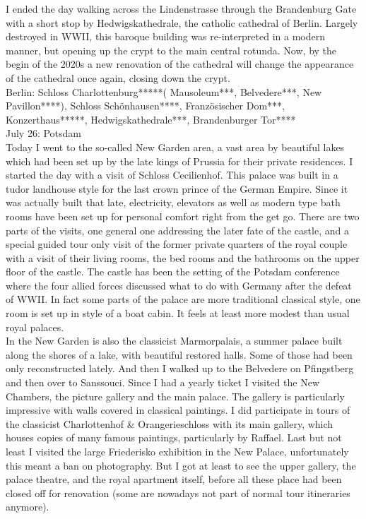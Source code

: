 I ended the day walking across the Lindenstrasse through the Brandenburg Gate with a short stop by Hedwigskathedrale, the catholic cathedral of Berlin. Largely destroyed in WWII, this baroque building was re-interpreted in a modern manner, but opening up the crypt to the main central rotunda. Now, by the begin of the 2020s a new renovation of the cathedral will change the appearance of the cathedral once again, closing down the crypt.\\

Berlin: Schloss Charlottenburg*****( Mausoleum***, Belvedere***, New Pavillon****), Schloss Sch\"onhausen****, Franz\"osischer Dom***, Konzerthaus*****, Hedwigskathedrale***, Brandenburger Tor****\\

July 26: Potsdam\\
Today I went to the so-called New Garden area, a vast area by beautiful lakes which had been set up by the late kings of Prussia for their private residences. I started the day with a visit of Schloss Cecilienhof. This palace was built in a tudor landhouse style for the last crown prince of the German Empire. Since it was actually built that late, electricity, elevators as well as modern type bath rooms have been set up for personal comfort right from the get go. There are two parts of the visits, one general one addressing the later fate of the castle, and a special guided tour only visit of the former private quarters of the royal couple with a visit of their living rooms, the bed rooms and the bathrooms on the upper floor of the castle. The castle has been the setting of the Potsdam conference where the four allied forces discussed what to do with Germany after the defeat of WWII. In fact some parts of the palace are more traditional classical style, one room is set up in style of a boat cabin. It feels at least more modest than usual royal palaces.\\

In the New Garden is also the classicist Marmorpalais, a summer palace built along the shores of a lake, with beautiful restored halls. Some of those had been only reconstructed lately. And then I walked up to the Belvedere on Pfingstberg and then over to Sanssouci. Since I had a yearly ticket I visited the New Chambers, the picture gallery and the main palace. The gallery is particularly impressive with walls covered in classical paintings. I did participate in tours of the classicist Charlottenhof \& Orangerieschloss with its main gallery, which houses copies of many famous paintings, particularly by Raffael. Last but not least I visited the large Friederisko exhibition in the New Palace, unfortunately this meant a ban on photography. But I got at least to see the upper gallery, the palace theatre, and the royal apartment itself, before all these place had been closed off for renovation (some are nowadays not part of normal tour itineraries anymore).\\

